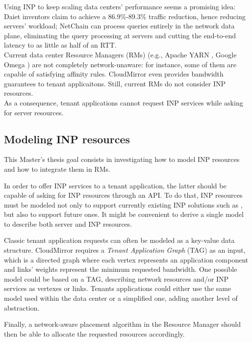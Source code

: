 Using INP to keep scaling data centers' performance seems a promising idea: Daiet \cite{daiet} inventors claim to achieve a 86.9\%-89.3\% traffic reduction, hence reducing servers' workload; NetChain \cite{netchain} can process queries entirely in the network data plane, eliminating the query processing at servers and cutting the end-to-end latency to as little as half of an RTT.\\
Current data center Resource Managers (RMs) (e.g., Apache YARN \cite{yarn}, Google Omega \cite{omega}) are not completely network-unaware: for instance, some of them are capable of satisfying affinity rules. CloudMirror \cite{cloudmirror} even provides bandwidth guarantees to tenant applicaitons. Still, current RMs do not consider INP resources.\\
As a consequence, tenant applications cannot request INP services while asking for server resources.

\subsection{Modeling INP resources}
This Master's thesis goal consists in investigating how to model INP resources and how to integrate them in RMs.\par
In order to offer INP services to a tenant application, the latter should be capable of asking for INP resources through an API. To do that, INP resources must be modeled not only to support currently existing INP solutions such as \cite{daiet} \cite{netchain} \cite{incbricks} \cite{sharp}, but also to support future ones. It might be convenient to derive a single model to describe both server and INP resources.\par
Classic tenant application requests can often be modeled as a key-value data structure. CloudMirror \cite{cloudmirror} requires a \textit{Tenant Application Graph} (TAG) as an input, which is a directed graph where each vertex represents an application component and links' weights represent the minimum requested bandwidth. One possible model could be based on a TAG, describing network resources and/or INP services as vertexes or links. Tenants applications could either use the same model used within the data center or a simplified one, adding another level of abstraction.\par
Finally, a network-aware placement algorithm in the Resource Manager should then be able to allocate the requested resources accordingly.
